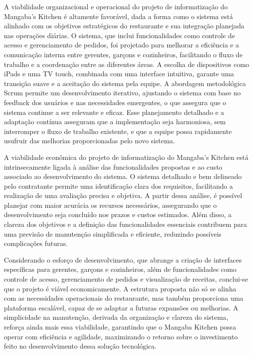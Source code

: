 \hspace{4.5mm}
A viabilidade organizacional e operacional do projeto de informatização do Mangaba's Kitchen é altamente favorável, dada a forma como o sistema está alinhado com os objetivos estratégicos do restaurante e sua integração planejada nas operações diárias. O sistema, que inclui funcionalidades como controle de acesso e gerenciamento de pedidos, foi projetado para melhorar a eficiência e a comunicação interna entre gerentes, garçons e cozinheiros, facilitando o fluxo de trabalho e a coordenação entre as diferentes áreas. A escolha de dispositivos como iPads e uma TV touch, combinada com uma interface intuitiva, garante uma transição suave e a aceitação do sistema pela equipe. A abordagem metodológica Scrum permite um desenvolvimento iterativo, ajustando o sistema com base no feedback dos usuários e nas necessidades emergentes, o que assegura que o sistema continue a ser relevante e eficaz. Esse planejamento detalhado e a adaptação contínua asseguram que a implementação seja harmoniosa, sem interromper o fluxo de trabalho existente, e que a equipe possa rapidamente usufruir das melhorias proporcionadas pelo novo sistema.
\par
A viabilidade econômica do projeto de informatização do Mangaba's Kitchen está intrinsecamente ligada à análise das funcionalidades propostas e ao custo associado ao desenvolvimento do sistema. O sistema detalhado e bem delineado pelo contratante permite uma identificação clara dos requisitos, facilitando a realização de uma avaliação precisa e objetiva. A partir dessa análise, é possível planejar com maior acurácia os recursos necessários, assegurando que o desenvolvimento seja concluído nos prazos e custos estimados. Além disso, a clareza dos objetivos e a definição das funcionalidades essenciais contribuem para uma previsão de manutenção simplificada e eficiente, reduzindo possíveis complicações futuras.
\par
Considerando o esforço de desenvolvimento, que abrange a criação de interfaces específicas para gerentes, garçons e cozinheiros, além de funcionalidades como controle de acesso, gerenciamento de pedidos e visualização de receitas, conclui-se que o projeto é viável economicamente. A estrutura proposta não só se alinha com as necessidades operacionais do restaurante, mas também proporciona uma plataforma escalável, capaz de se adaptar a futuras expansões ou melhorias. A simplicidade na manutenção, derivada da organização e clareza do sistema, reforça ainda mais essa viabilidade, garantindo que o Mangaba Kitchen possa operar com eficiência e agilidade, maximizando o retorno sobre o investimento feito no desenvolvimento dessa solução tecnológica.
